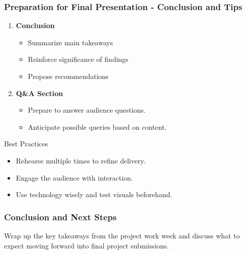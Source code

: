 \documentclass{beamer}
\begin{document}
\begin{frame}[fragile]
    \frametitle{Preparation for Final Presentation - Conclusion and Tips}
    \begin{enumerate}
        \item \textbf{Conclusion}
            \begin{itemize}
                \item Summarize main takeaways
                \item Reinforce significance of findings
                \item Propose recommendations
            \end{itemize}

        \item \textbf{Q\&A Section}
            \begin{itemize}
                \item Prepare to answer audience questions.
                \item Anticipate possible queries based on content.
            \end{itemize}
    \end{enumerate}

    \begin{block}{Best Practices}
        \begin{itemize}
            \item Rehearse multiple times to refine delivery.
            \item Engage the audience with interaction.
            \item Use technology wisely and test visuals beforehand.
        \end{itemize}
    \end{block}
\end{frame}

\begin{frame}[fragile]
    \frametitle{Conclusion and Next Steps}
    Wrap up the key takeaways from the project work week and discuss what to expect moving forward into final project submissions.
\end{frame}
\end{document}
